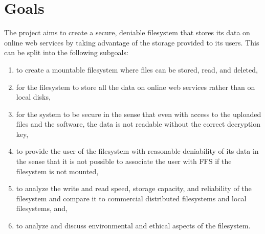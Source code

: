 
\section{Goals}


The project aims to create a secure, deniable filesystem that stores its data on online web services by taking advantage of the storage provided to its users. This can be split into the following subgoals:
\begin{enumerate}
\item to create a mountable filesystem where files can be stored, read, and deleted,
\item for the filesystem to store all the data on online web services rather than on local disks,
\item for the system to be secure in the sense that even with access to the uploaded files and the software, the data is not readable without the correct decryption key, 
\item to provide the user of the filesystem with reasonable deniability of its data in the sense that it is not possible to associate the user with FFS if the filesystem is not mounted,
\item to analyze the write and read speed, storage capacity, and reliability of the filesystem and compare it to commercial distributed filesystems and local filesystems, and,
\item to analyze and discuss environmental and ethical aspects of the filesystem.
\end{enumerate}

